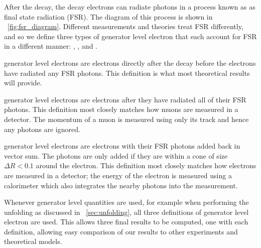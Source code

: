 After the \Ztoee decay, the decay electrons can radiate photons in a process
known as as final state radiation (FSR). The diagram of this process is shown
in \FIG~\ref{fig:fsr_diagram}. Different measurements and theories treat FSR
differently, and so we define three types of generator level electron that each
account for FSR in a different manner: \born, \bare, and \dressed.

\Born generator level electrons are electrons directly after the \Ztoee decay
before the electrons have radiated any FSR photons. This definition is what
most theoretical results will provide.

\Bare generator level electrons are \born electrons after they have radiated all
of their FSR photons. This definition most closely matches how muons are
measured in a detector. The momentum of a muon is measured using only its track
and hence any photons are ignored.

\Dressed generator level electrons are \bare electrons with their FSR photons
added back in vector sum. The photons are only added if they are within a cone
of size $\Delta R < 0.1$ around the electron. This definition most closely
matches how electrons are measured in a detector; the energy of the electron is
measured using a calorimeter which also integrates the nearby photons into the
measurement.

Whenever generator level quantities are used, for example when performing the
unfolding as discussed in \CHP~\ref{sec:unfolding}, all three definitions
of generator level electron are used. This allows three final results to be
computed, one with each definition, allowing easy comparison of our results to
other experiments and theoretical models.
